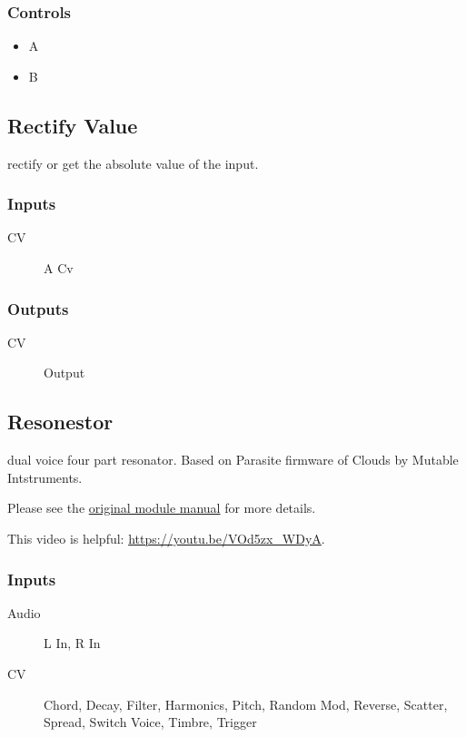 \subsubsection{Controls}
\begin{itemize}
\item A
\item B
\end{itemize}

\subsection{Rectify Value}

rectify or get the absolute value of the input. 



\subsubsection{Inputs}
\begin{description}
\item [CV] A Cv
\end{description}

\subsubsection{Outputs}
\begin{description}
\item [CV] Output
\end{description}

\subsection{Resonestor}

dual voice four part resonator. Based on Parasite firmware of Clouds by Mutable Intstruments.



Please see the \href{https://mqtthiqs.github.io/parasites/clouds.html}{original module manual} for more details.

This video is helpful: \url{https://youtu.be/VOd5zx_WDyA}.

\subsubsection{Inputs}
\begin{description}
\item [Audio] L In, R In
\item [CV] Chord, Decay, Filter, Harmonics, Pitch, Random Mod, Reverse, Scatter, Spread, Switch Voice, Timbre, Trigger
\end{description}

